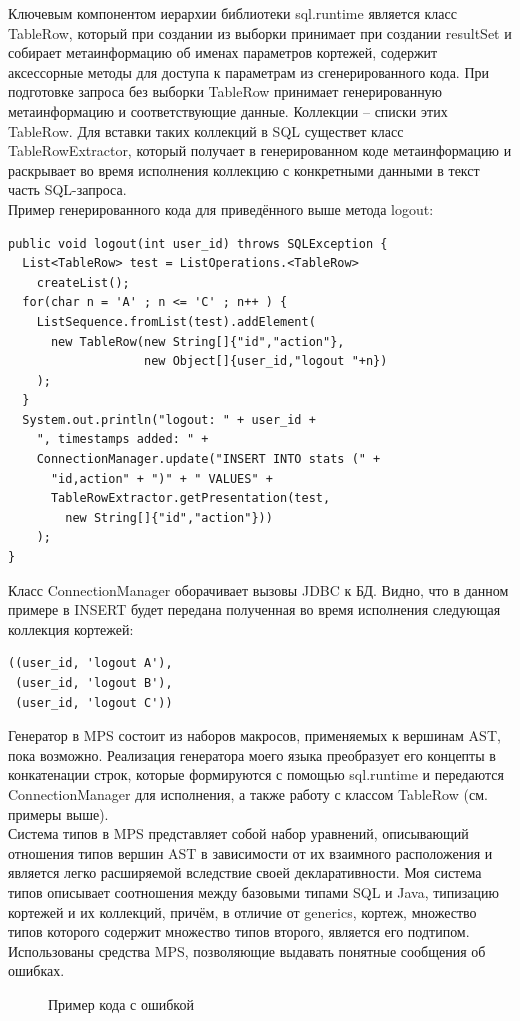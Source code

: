 \documentclass[12pt]{article}
\begin{document}
Ключевым компонентом иерархии библиотеки sql.runtime является класс TableRow, который при создании из выборки принимает при создании resultSet и собирает метаинформацию об именах параметров кортежей, содержит аксессорные методы для доступа к параметрам из сгенерированного кода. При подготовке запроса без выборки TableRow принимает генерированную метаинформацию и соответствующие данные. Коллекции -- списки этих TableRow. Для вставки таких коллекций в SQL существет класс TableRowExtractor, который получает в генерированном коде метаинформацию и раскрывает во время исполнения коллекцию с конкретными данными в текст часть SQL-запроса.\\
Пример генерированного кода для приведённого выше метода logout:
\begin{lstlisting}
public void logout(int user_id) throws SQLException {
  List<TableRow> test = ListOperations.<TableRow>
    createList();
  for(char n = 'A' ; n <= 'C' ; n++ ) {
    ListSequence.fromList(test).addElement(
      new TableRow(new String[]{"id","action"},
                   new Object[]{user_id,"logout "+n})
    );
  }
  System.out.println("logout: " + user_id +
    ", timestamps added: " +
    ConnectionManager.update("INSERT INTO stats (" +
      "id,action" + ")" + " VALUES" +
      TableRowExtractor.getPresentation(test,
        new String[]{"id","action"}))
    );
}
\end{lstlisting}
Класс ConnectionManager оборачивает вызовы JDBC к БД. Видно, что в данном примере в INSERT будет передана полученная во время исполнения следующая коллекция кортежей:
\begin{lstlisting}
((user_id, 'logout A'),
 (user_id, 'logout B'),
 (user_id, 'logout C'))
\end{lstlisting}
Генератор в MPS состоит из наборов макросов, применяемых к вершинам AST, пока возможно. Реализация генератора моего языка преобразует его концепты в конкатенации строк, которые формируются с помощью sql.runtime и передаются ConnectionManager для исполнения, а также работу с классом TableRow (см. примеры выше).\\

Система типов в MPS представляет собой набор уравнений, описывающий отношения типов вершин AST в зависимости от их взаимного расположения и является легко расширяемой вследствие своей декларативности. Моя система типов описывает соотношения между базовыми типами SQL и Java, типизацию кортежей и их коллекций, причём, в отличие от generics, кортеж, множество типов которого содержит множество типов второго, является его подтипом. Использованы средства MPS, позволяющие выдавать понятные сообщения об ошибках.
\begin{figure}[h]
\caption{Пример кода с ошибкой}
\end{figure}
\end{document}
